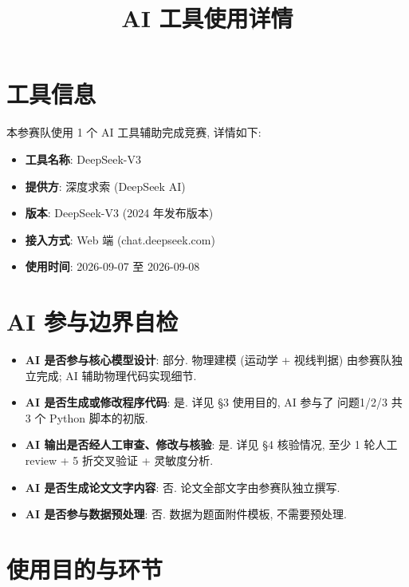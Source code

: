 \documentclass[electronic]{format}
\title{AI 工具使用详情}
\begin{document}
\maketitle
\thispagestyle{plain}
\vspace{-2em}

\section{工具信息}

本参赛队使用 1 个 AI 工具辅助完成竞赛, 详情如下:

\begin{itemize}
  \item \textbf{工具名称}: DeepSeek-V3
  \item \textbf{提供方}: 深度求索 (DeepSeek AI)
  \item \textbf{版本}: DeepSeek-V3 (2024 年发布版本)
  \item \textbf{接入方式}: Web 端 (chat.deepseek.com)
  \item \textbf{使用时间}: 2026-09-07 至 2026-09-08
\end{itemize}

\section{AI 参与边界自检}

\begin{itemize}
  \item \textbf{AI 是否参与核心模型设计}: 部分. 物理建模 (运动学 + 视线判据) 由参赛队独立完成; AI 辅助物理代码实现细节.
  \item \textbf{AI 是否生成或修改程序代码}: 是. 详见 §3 使用目的, AI 参与了 问题1/2/3 共 3 个 Python 脚本的初版.
  \item \textbf{AI 输出是否经人工审查、修改与核验}: 是. 详见 §4 核验情况, 至少 1 轮人工 review + 5 折交叉验证 + 灵敏度分析.
  \item \textbf{AI 是否生成论文文字内容}: 否. 论文全部文字由参赛队独立撰写.
  \item \textbf{AI 是否参与数据预处理}: 否. 数据为题面附件模板, 不需要预处理.
\end{itemize}

\section{使用目的与环节}
\end{document}
